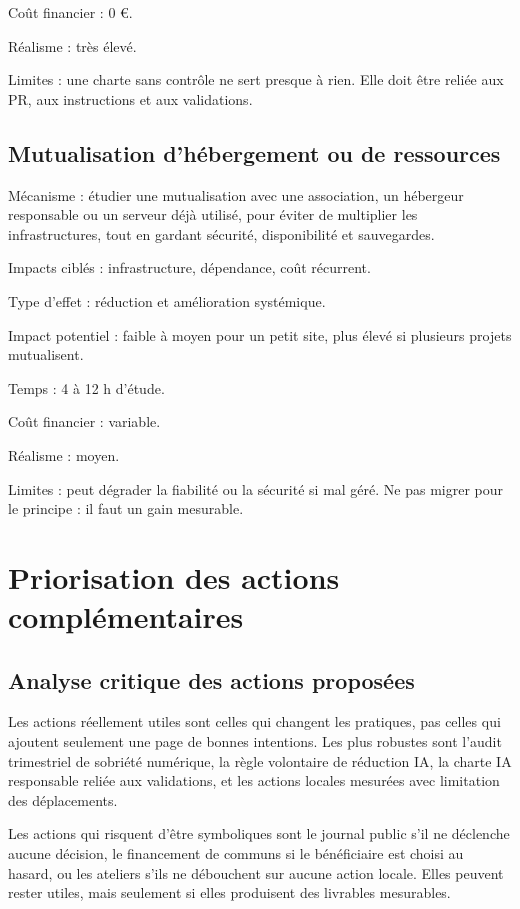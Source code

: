 \documentclass[
  10pt,
  a4paper,
  DIV=11,
  numbers=noendperiod,
  oneside]{scrreprt}
\begin{document}
Coût financier : 0 €.

Réalisme : très élevé.

Limites : une charte sans contrôle ne sert presque à rien. Elle doit
être reliée aux PR, aux instructions et aux validations.

\subsection{Mutualisation d'hébergement ou de
ressources}\label{mutualisation-dhuxe9bergement-ou-de-ressources}

Mécanisme : étudier une mutualisation avec une association, un hébergeur
responsable ou un serveur déjà utilisé, pour éviter de multiplier les
infrastructures, tout en gardant sécurité, disponibilité et sauvegardes.

Impacts ciblés : infrastructure, dépendance, coût récurrent.

Type d'effet : réduction et amélioration systémique.

Impact potentiel : faible à moyen pour un petit site, plus élevé si
plusieurs projets mutualisent.

Temps : 4 à 12 h d'étude.

Coût financier : variable.

Réalisme : moyen.

Limites : peut dégrader la fiabilité ou la sécurité si mal géré. Ne pas
migrer pour le principe : il faut un gain mesurable.

\section{Priorisation des actions
complémentaires}\label{priorisation-des-actions-compluxe9mentaires}

\subsection{Analyse critique des actions
proposées}\label{analyse-critique-des-actions-proposuxe9es}

Les actions réellement utiles sont celles qui changent les pratiques,
pas celles qui ajoutent seulement une page de bonnes intentions. Les
plus robustes sont l'audit trimestriel de sobriété numérique, la règle
volontaire de réduction IA, la charte IA responsable reliée aux
validations, et les actions locales mesurées avec limitation des
déplacements.

Les actions qui risquent d'être symboliques sont le journal public s'il
ne déclenche aucune décision, le financement de communs si le
bénéficiaire est choisi au hasard, ou les ateliers s'ils ne débouchent
sur aucune action locale. Elles peuvent rester utiles, mais seulement si
elles produisent des livrables mesurables.
\end{document}
